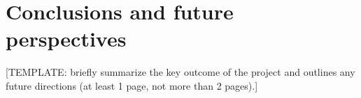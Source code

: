 \chapter{Conclusions and future perspectives}

[TEMPLATE:  briefly summarize the key outcome of the project and outlines any future directions (at least 1 page, not more than 2 pages).]